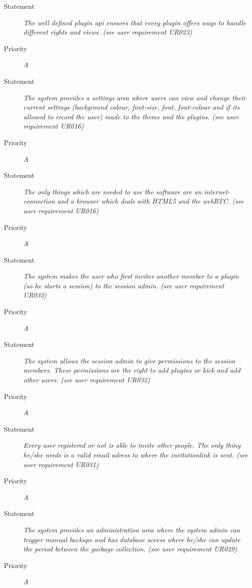 \FR
\begin{description}
  \item[Statement]
    \textit{The well defined plugin api ensures that every plugin offers ways to handle different rights and views. (see user requirement UR023)}
  \item[Priority]
    \textit{A}
\end{description}

\FR
\begin{description}
  \item[Statement]
    \textit{The system provides a settings area where users can view and change their current settings (background colour, font-size, font, font-colour and if its allowed to record the user) made to the theme and the plugins. (see user requirement UR016)}
  \item[Priority]
    \textit{A}
\end{description}

\FR
\begin{description}
  \item[Statement]
    \textit{The only things which are needed to use the software are an internet-connection and a browser which deals with HTML5 and the webRTC. (see user requirement UR016)}
  \item[Priority]
    \textit{A}
\end{description}

\FR
\begin{description}
  \item[Statement]
    \textit{The system makes the user who first invites another member to a plugin (so he starts a session) to the session admin. (see user requirement UR032)}
  \item[Priority]
    \textit{A}
\end{description}

\FR
\begin{description}
  \item[Statement]
    \textit{The system allows the session admin to give permissions to the session members. These permissions are the right to add plugins or kick and add other users. (see user requirement UR032)}
  \item[Priority]
    \textit{A}
\end{description}

\FR
\begin{description}
  \item[Statement]
    \textit{Every user registered or not is able to invite other people. The only thing he/she needs is a valid email adress to where the invitationlink is sent. (see user requirement UR031)}
  \item[Priority]
    \textit{A}
\end{description}

\FR
\begin{description}
  \item[Statement]
    \textit{The system provides an administration area where the system admin can trigger manual backups and has database access where he/she can update the period between the garbage collection. (see user requirement UR029)}
  \item[Priority]
    \textit{A}
\end{description}
